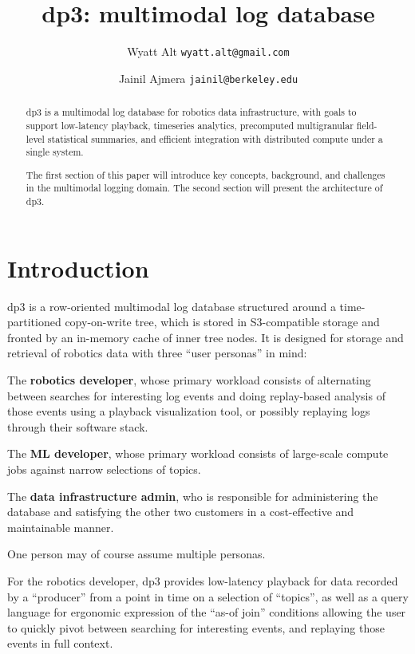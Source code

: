 \documentclass[9pt,twocolumn]{article}
\title{dp3: multimodal log database}
\author{
    Wyatt Alt
    \texttt{wyatt.alt@gmail.com}
    \and
    Jainil Ajmera
    \texttt{jainil@berkeley.edu}
    }
\newcommand{\q}[1]{``#1''}
\begin{document}
    \maketitle

    \begin{abstract}
      dp3 is a multimodal log database for robotics data infrastructure, with goals
      to support low-latency playback, timeseries analytics, precomputed
      multigranular field-level statistical summaries, and efficient integration with
      distributed compute under a single system.

      The first section of this paper will introduce key concepts, background,
      and challenges in the multimodal logging domain. The second section will
      present the architecture of dp3.
    \end{abstract}

    \section{Introduction}
    dp3 is a row-oriented multimodal log database structured around a
    time-partitioned copy-on-write tree, which is stored in S3-compatible
    storage and fronted by an in-memory cache of inner tree nodes. It is
    designed for storage and retrieval of robotics data with three \q{user
    personas} in mind:

    The \textbf{robotics developer}, whose primary workload consists of
    alternating between searches for interesting log events and doing
    replay-based analysis of those events using a playback visualization tool,
    or possibly replaying logs through their software stack.

    The \textbf{ML developer}, whose primary workload consists of large-scale compute
    jobs against narrow selections of topics.

    The \textbf{data infrastructure admin}, who is responsible for administering the
    database and satisfying the other two customers in a cost-effective and
    maintainable manner.

    One person may of course assume multiple personas.

    For the robotics developer, dp3 provides low-latency playback for data recorded
    by a \q{producer} from a point in time on a selection of \q{topics}, as well as a
    query language for ergonomic expression of the \q{as-of join} conditions
    allowing the user to quickly pivot between searching for interesting events,
    and replaying those events in full context.
\end{document}
